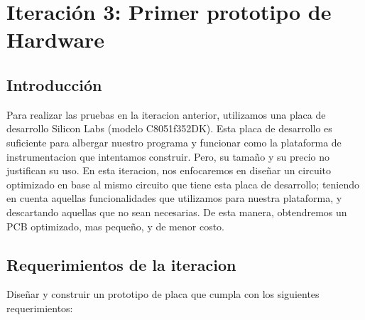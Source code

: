 \chapter{Iteración 3: Primer prototipo de Hardware} %
\label{cha:iteracion_3}


\section{Introducción} %
\label{it3:sec:introduccion}

Para realizar las pruebas en la iteracion anterior, utilizamos una placa de desarrollo Silicon Labs (modelo C8051f352DK). Esta placa de desarrollo es suficiente para albergar nuestro programa y funcionar como la plataforma de instrumentacion que intentamos construir. Pero, su tamaño y su precio no justifican su uso. En esta iteracion, nos enfocaremos en diseñar un circuito optimizado en base al mismo circuito que tiene esta placa de desarrollo; teniendo en cuenta aquellas funcionalidades que utilizamos para nuestra plataforma, y descartando aquellas que no sean necesarias. De esta manera, obtendremos un PCB optimizado, mas pequeño, y de menor costo.




\section{Requerimientos de la iteracion} %
\label{it3:sec:requerimientos_de_la_iteracion}

Diseñar y construir un prototipo de placa que cumpla con los siguientes requerimientos:

